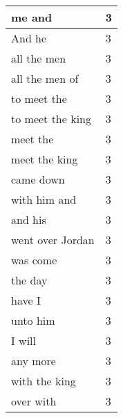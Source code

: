 \begin{center}
\begin{longtable}{|p{3.0in}|p{0.5in}|}
me and & 3\\ \hline 
And he & 3\\ \hline 
all the men & 3\\ \hline 
all the men of & 3\\ \hline 
to meet the & 3\\ \hline 
to meet the king & 3\\ \hline 
meet the & 3\\ \hline 
meet the king & 3\\ \hline 
came down & 3\\ \hline 
with him and & 3\\ \hline 
and his & 3\\ \hline 
went over Jordan & 3\\ \hline 
was come & 3\\ \hline 
the day & 3\\ \hline 
have I & 3\\ \hline 
unto him & 3\\ \hline 
I will & 3\\ \hline 
any more & 3\\ \hline 
with the king & 3\\ \hline 
over with & 3\\ \hline 
\end{longtable}
\end{center}





